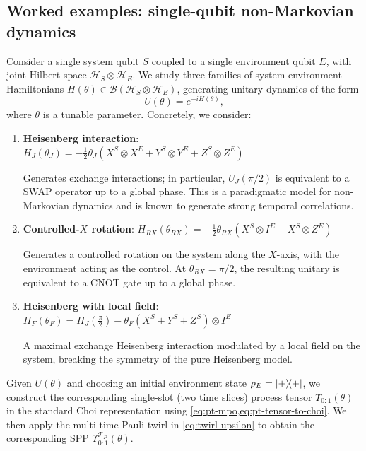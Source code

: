\subsection{Worked examples: single-qubit non-Markovian dynamics}
Consider a single system qubit \(S\) coupled to a single environment qubit \(E\), with joint Hilbert space \(\mathcal{H}_S \otimes \mathcal{H}_E\). We study three families of system-environment Hamiltonians \(H(\theta)\in\mathcal{B}(\mathcal{H}_S\otimes\mathcal{H}_E)\), generating unitary dynamics of the form
\begin{equation}
  U(\theta) = e^{-iH(\theta)},
\end{equation}
where \(\theta\) is a tunable parameter. Concretely, we consider:
\begin{enumerate}
  \item \textbf{Heisenberg interaction}: \(H_J(\theta_J) = -\frac{1}{2} \theta_J (X^S \otimes X^E + Y^S \otimes Y^E + Z^S \otimes Z^E)\)
  
  Generates exchange interactions; in particular, \(U_J(\pi/2)\) is equivalent to a SWAP operator up to a global phase. This is a paradigmatic model for non-Markovian dynamics and is known to generate strong temporal correlations.

  \item \textbf{Controlled-\(X\) rotation}: \(H_{RX}(\theta_{RX}) = -\frac{1}{2} \theta_{RX}  (X^S \otimes I^E - X^S \otimes Z^E)\)
  
  Generates a controlled rotation on the system along the \(X\)-axis, with the environment acting as the control. At \(\theta_{RX} = \pi/2\), the resulting unitary is equivalent to a CNOT gate up to a global phase.

  \item \textbf{Heisenberg with local field}: \(H_F(\theta_F) = H_J(\frac{\pi}{2}) - \theta_F(X^S + Y^S + Z^S) \otimes I^E\)
  
  A maximal exchange Heisenberg interaction modulated by a local field on the system, breaking the symmetry of the pure Heisenberg model.

\end{enumerate}
Given \(U(\theta)\) and choosing an initial environment state \(\rho_E = \ket{+}\!\!\bra{+}\), we construct the corresponding single-slot (two time slices) process tensor \(\Upsilon_{0:1}(\theta)\) in the standard Choi representation using \cref{eq:pt-mpo,eq:pt-tensor-to-choi}. We then apply the multi-time Pauli twirl in \cref{eq:twirl-upsilon} to obtain the corresponding SPP \(\Upsilon_{0:1}^{\mathcal{T}_P}(\theta)\).

